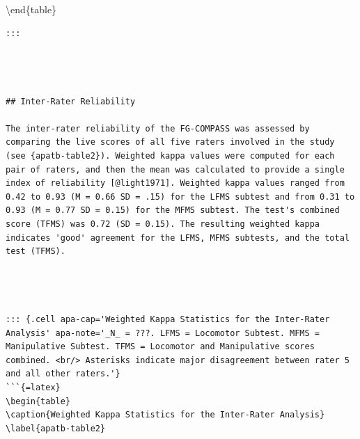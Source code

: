 \documentclass[
  man,
  colorlinks=true,linkcolor=blue,citecolor=blue,urlcolor=blue]{apa7}
\begin{document}
\begin{table}
\textbackslash end\{table\}

\begin{verbatim}
:::




## Inter-Rater Reliability

The inter-rater reliability of the FG-COMPASS was assessed by comparing the live scores of all five raters involved in the study (see {apatb-table2}). Weighted kappa values were computed for each pair of raters, and then the mean was calculated to provide a single index of reliability [@light1971]. Weighted kappa values ranged from 0.42 to 0.93 (M = 0.66 SD = .15) for the LFMS subtest and from 0.31 to 0.93 (M = 0.77 SD = 0.15) for the MFMS subtest. The test's combined score (TFMS) was 0.72 (SD = 0.15). The resulting weighted kappa indicates 'good' agreement for the LFMS, MFMS subtests, and the total test (TFMS).




::: {.cell apa-cap='Weighted Kappa Statistics for the Inter-Rater Analysis' apa-note='_N_ = ???. LFMS = Locomotor Subtest. MFMS = Manipulative Subtest. TFMS = Locomotor and Manipulative scores combined. <br/> Asterisks indicate major disagreement between rater 5 and all other raters.'}
```{=latex}
\begin{table}
\caption{Weighted Kappa Statistics for the Inter-Rater Analysis}
\label{apatb-table2}
\end{verbatim}


\end{table}
\end{document}
